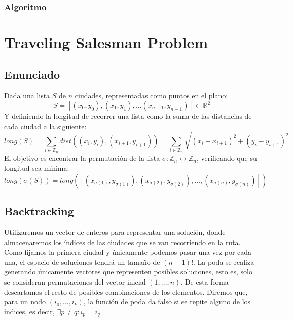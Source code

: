 \documentclass[a4paper, 11pt]{article} %
\begin{document}
	  \subsubsection{Algoritmo}
	    
	    \small
	    \texttt{}
	    \normalsize

    
    
    \section{Traveling Salesman Problem}
      \subsection{Enunciado}
	Dada una lista $S$ de $n$ ciudades, representadas como puntos en el plano:
	\begin{equation}
	    S = [(x_0,y_0), (x_1,y_1), \dots (x_{n-1},y_{n-1})] \subset \mathbb{R}^2
	\end{equation}
	Y definiendo la longitud de recorrer una lista como la suma de las distancias de cada ciudad a la siguiente:
	\begin{equation}
	    long(S) = \sum_{i \in \mathbb{Z}_n} dist((x_i,y_i), (x_{i+1}, y_{i+1})) = \sum_{i \in \mathbb{Z}_n} \sqrt{(x_i-x_{i+1})^2 + (y_i-y_{i+1})^2}
	\end{equation}
	El objetivo es encontrar la permutación de la lista $\sigma : \mathbb{Z}_n \leftrightarrow \mathbb{Z}_n$, verificando que su longitud sea mínima:
	\begin{equation}
	    long(\sigma(S)) = long([(x_{\sigma(1)},y_{\sigma(1)}), (x_{\sigma(2)},y_{\sigma(2)}), \dots, (x_{\sigma(n)},y_{\sigma(n)})])
    \end{equation}
    
      \subsection{Backtracking}
	Utilizaremos un vector de enteros para representar una solución, donde almacenaremos los 
	índices de las ciudades que se van recorriendo en la ruta. Como fijamos la primera ciudad 
	y únicamente podemos pasar una vez por cada una, el espacio de soluciones tendrá un tamaño 
	de $(n-1)!$.
	La poda se realiza generando únicamente vectores que representen posibles soluciones, esto es, 
	solo se consideran permutaciones del vector inicial $(1,\dots,n)$. De esta forma descartamos el 
	resto de posibles combinaciones de los elementos. Diremos que, para un nodo $(i_0, \dots, i_k)$, 
	la función de poda da falso si se repite alguno de los índices, es decir, $\exists p\ne q : i_p = i_q$.
    
\end{document}
